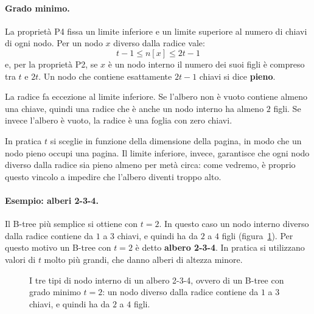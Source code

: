 \paragraph{Grado minimo.}
La proprietà P4 fissa un limite inferiore e un limite superiore al numero di chiavi di ogni nodo. Per un nodo $x$ diverso dalla radice vale:
\[
t - 1 \le n[x] \le 2t - 1
\]
e, per la proprietà P2, se $x$ è un nodo interno il numero dei suoi figli è compreso tra $t$ e $2t$. Un nodo che contiene esattamente $2t-1$ chiavi si dice \textbf{pieno}.

La radice fa eccezione al limite inferiore. Se l'albero non è vuoto contiene almeno una chiave, quindi una radice che è anche un nodo interno ha almeno $2$ figli. Se invece l'albero è vuoto, la radice è una foglia con zero chiavi.

In pratica $t$ si sceglie in funzione della dimensione della pagina, in modo che un nodo pieno occupi una pagina. Il limite inferiore, invece, garantisce che ogni nodo diverso dalla radice sia pieno almeno per metà circa: come vedremo, è proprio questo vincolo a impedire che l'albero diventi troppo alto.

\paragraph{Esempio: alberi 2-3-4.}
Il B-tree più semplice si ottiene con $t = 2$. In questo caso un nodo interno diverso dalla radice contiene da $1$ a $3$ chiavi, e quindi ha da $2$ a $4$ figli (figura~\ref{fig:234}). Per questo motivo un B-tree con $t = 2$ è detto \textbf{albero 2-3-4}. In pratica si utilizzano valori di $t$ molto più grandi, che danno alberi di altezza minore.

\begin{figure}[htbp]
\centering
{}
\caption{I tre tipi di nodo interno di un albero 2-3-4, ovvero di un B-tree con grado minimo $t = 2$: un nodo diverso dalla radice contiene da $1$ a $3$ chiavi, e quindi ha da $2$ a $4$ figli.}
\label{fig:234}
\end{figure}

